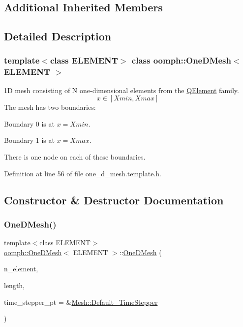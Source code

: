 \subsection*{Additional Inherited Members}


\subsection{Detailed Description}
\subsubsection*{template$<$class E\+L\+E\+M\+E\+NT$>$\newline
class oomph\+::\+One\+D\+Mesh$<$ E\+L\+E\+M\+E\+N\+T $>$}

1D mesh consisting of N one-\/dimensional elements from the \hyperlink{classoomph_1_1QElement}{Q\+Element} family. \[ x \in [Xmin,Xmax] \] The mesh has two boundaries\+:
\begin{DoxyItemize}
\item Boundary 0 is at $x=Xmin$.
\item Boundary 1 is at $x=Xmax$.
\end{DoxyItemize}There is one node on each of these boundaries. 

Definition at line 56 of file one\+\_\+d\+\_\+mesh.\+template.\+h.



\subsection{Constructor \& Destructor Documentation}
\mbox{\label{classoomph_1_1OneDMesh_ac6962f5c0184d302544253e3b4407c48}} 
\subsubsection{\texorpdfstring{One\+D\+Mesh()}{OneDMesh()}\hspace{0.1cm}{\footnotesize\ttfamily [1/2]}}
{\footnotesize\ttfamily template$<$class E\+L\+E\+M\+E\+NT$>$ \\
\hyperlink{classoomph_1_1OneDMesh}{oomph\+::\+One\+D\+Mesh}$<$ E\+L\+E\+M\+E\+NT $>$\+::\hyperlink{classoomph_1_1OneDMesh}{One\+D\+Mesh} (\begin{DoxyParamCaption}\item[{const unsigned \&}]{n\+\_\+element,  }\item[{const double \&}]{length,  }\item[{\hyperlink{classoomph_1_1TimeStepper}{Time\+Stepper} $\ast$}]{time\+\_\+stepper\+\_\+pt = {\ttfamily \&\hyperlink{classoomph_1_1Mesh_a12243d0fee2b1fcee729ee5a4777ea10}{Mesh\+::\+Default\+\_\+\+Time\+Stepper}} }\end{DoxyParamCaption})\hspace{0.3cm}{\ttfamily [inline]}}



